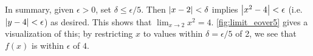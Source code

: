\begin{example}
In summary, given $\epsilon > 0$, set $\delta\leq\epsilon/5$.  Then $\left\lvert x - 2 \right\rvert < \delta$ implies 
$\left\lvert x^2 - 4 \right\rvert< \epsilon$ (i.e.\ $\left\lvert y - 4 \right\rvert< \epsilon$) as desired.  This shows that $\displaystyle \lim_{x\rightarrow 2} x^2 = 4 $. \autoref{fig:limit_eover5} gives a visualization of this; by restricting $x$ to values within $\delta = \epsilon/5$ of 2, we see that $f(x)$ is within $\epsilon$ of $4$.
\end{example}

%
%
%
%
